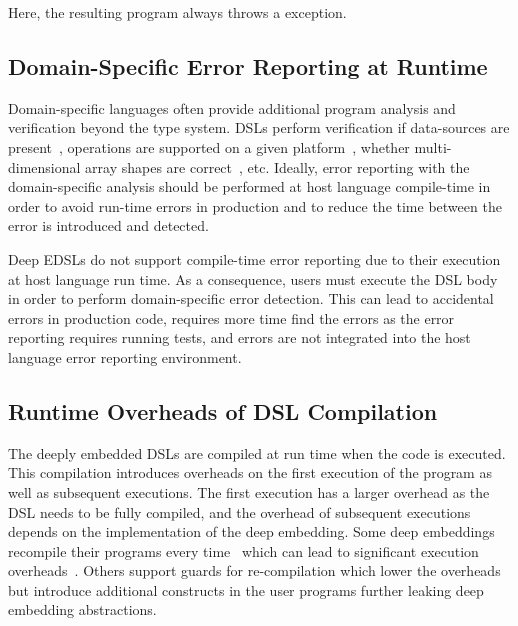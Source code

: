 Here, the resulting program always throws a 
exception.

\subsection{Domain-Specific Error Reporting at Runtime}
\label{sec:domain-specific-error-reporting-runtime}

Domain-specific languages often provide additional program analysis and verification
 beyond the type system. DSLs perform verification if data-sources are present~\cite{mcclure2005sql,zaharia2012resilient}, operations are supported on a given platform~\cite{slick}, whether multi-dimensional array shapes are correct~\cite{ureche_stagedsac:_2012}, etc.
 Ideally, error reporting with the domain-specific analysis should be performed at host language
 compile-time in order to avoid run-time errors in production and to reduce the time between
 the error is introduced and detected.

Deep EDSLs do not support compile-time error reporting due to their execution at host language run time.
 As a consequence, users must execute the DSL body in order to perform domain-specific error detection. This
 can lead to accidental errors in production code, requires more time find the errors as the error reporting
 requires running tests, and errors are not integrated into the host language error
 reporting environment.


\subsection{Runtime Overheads of DSL Compilation}
\label{sec:runtime-overheads}

The deeply embedded DSLs are compiled at run time when the code is executed. This compilation
 introduces overheads on the first execution of the program as well as subsequent executions. The first execution
 has a larger overhead as the DSL needs to be fully compiled, and the overhead of subsequent
 executions depends on the implementation of the deep embedding. Some deep embeddings
 recompile their programs every time~\cite{rompf2012lightweight,slick} which can lead to significant
 execution overheads~. Others support guards for re-compilation which lower
 the overheads but introduce additional constructs in the user programs further
 leaking deep embedding abstractions.

